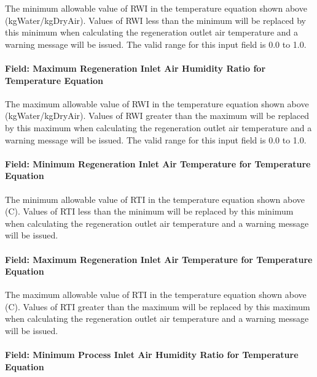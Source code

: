 The minimum allowable value of RWI in the temperature equation shown above (kgWater/kgDryAir). Values of RWI less than the minimum will be replaced by this minimum when calculating the regeneration outlet air temperature and a warning message will be issued. The valid range for this input field is 0.0 to 1.0.

\paragraph{Field: Maximum Regeneration Inlet Air Humidity Ratio for Temperature Equation}\label{field-maximum-regeneration-inlet-air-humidity-ratio-for-temperature-equation}

The maximum allowable value of RWI in the temperature equation shown above (kgWater/kgDryAir). Values of RWI greater than the maximum will be replaced by this maximum when calculating the regeneration outlet air temperature and a warning message will be issued. The valid range for this input field is 0.0 to 1.0.

\paragraph{Field: Minimum Regeneration Inlet Air Temperature for Temperature Equation}\label{field-minimum-regeneration-inlet-air-temperature-for-temperature-equation}

The minimum allowable value of RTI in the temperature equation shown above (C). Values of RTI less than the minimum will be replaced by this minimum when calculating the regeneration outlet air temperature and a warning message will be issued.

\paragraph{Field: Maximum Regeneration Inlet Air Temperature for Temperature Equation}\label{field-maximum-regeneration-inlet-air-temperature-for-temperature-equation}

The maximum allowable value of RTI in the temperature equation shown above (C). Values of RTI greater than the maximum will be replaced by this maximum when calculating the regeneration outlet air temperature and a warning message will be issued.

\paragraph{Field: Minimum Process Inlet Air Humidity Ratio for Temperature Equation}\label{field-minimum-process-inlet-air-humidity-ratio-for-temperature-equation}

